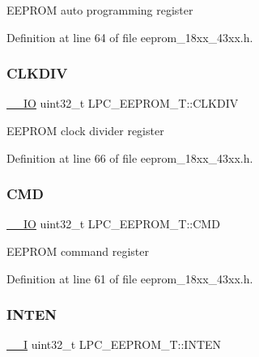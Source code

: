 E\+E\+P\+R\+OM auto programming register 

Definition at line 64 of file eeprom\+\_\+18xx\+\_\+43xx.\+h.

\mbox{\label{struct_l_p_c___e_e_p_r_o_m___t_a5f3894157767f70ca15a1d94a877dd22}} 
\subsubsection{\texorpdfstring{C\+L\+K\+D\+IV}{CLKDIV}}
{\footnotesize\ttfamily \hyperlink{core__sc300_8h_aec43007d9998a0a0e01faede4133d6be}{\+\_\+\+\_\+\+IO} uint32\+\_\+t L\+P\+C\+\_\+\+E\+E\+P\+R\+O\+M\+\_\+\+T\+::\+C\+L\+K\+D\+IV}

E\+E\+P\+R\+OM clock divider register 

Definition at line 66 of file eeprom\+\_\+18xx\+\_\+43xx.\+h.

\mbox{\label{struct_l_p_c___e_e_p_r_o_m___t_aac6ea16d595bcdc476f09f5d650ed51a}} 
\subsubsection{\texorpdfstring{C\+MD}{CMD}}
{\footnotesize\ttfamily \hyperlink{core__sc300_8h_aec43007d9998a0a0e01faede4133d6be}{\+\_\+\+\_\+\+IO} uint32\+\_\+t L\+P\+C\+\_\+\+E\+E\+P\+R\+O\+M\+\_\+\+T\+::\+C\+MD}

E\+E\+P\+R\+OM command register 

Definition at line 61 of file eeprom\+\_\+18xx\+\_\+43xx.\+h.

\mbox{\label{struct_l_p_c___e_e_p_r_o_m___t_a6364196d8d0c7c9ab756c2e36415c635}} 
\subsubsection{\texorpdfstring{I\+N\+T\+EN}{INTEN}}
{\footnotesize\ttfamily \hyperlink{core__sc300_8h_af63697ed9952cc71e1225efe205f6cd3}{\+\_\+\+\_\+I} uint32\+\_\+t L\+P\+C\+\_\+\+E\+E\+P\+R\+O\+M\+\_\+\+T\+::\+I\+N\+T\+EN}

